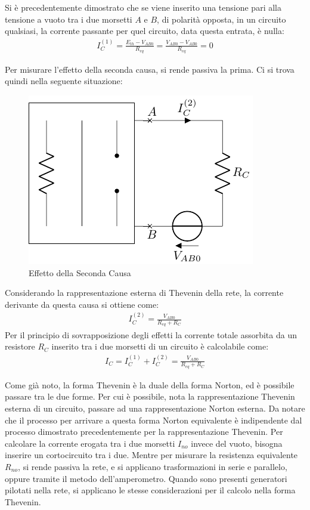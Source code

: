 \documentclass{article}
\numberwithin{equation}{subsection}
\begin{document}
Si è precedentemente dimostrato che se viene inserito una tensione pari alla tensione a vuoto tra i due morsetti $A$ e $B$, di polarità opposta, in un circuito qualsiasi, 
la corrente passante per quel circuito, data questa entrata, è nulla: 
\begin{gather*}
    I_C^{(1)}=\displaystyle\frac{E_{th}-V_{AB0}}{R_{eq}}=\frac{V_{AB0}-V_{AB0}}{R_{eq}}=0
\end{gather*}

Per misurare l'effetto della seconda causa, si rende passiva la prima. Ci si trova quindi nella seguente situazione: 
\begin{figure}[H]%
    \centering
    \includegraphics{seconda-causa-corrente-carico.pdf}
    \caption{Effetto della Seconda Causa}
    \label{fig:seconda-causa-corrente-carico}
\end{figure}
Considerando la rappresentazione esterna di Thevenin della rete, la corrente derivante da questa causa si ottiene come:
\begin{gather*}
    I_C^{(2)}=\displaystyle\frac{V_{AB0}}{R_{eq}+R_{C}}
\end{gather*}
Per il principio di sovrapposizione degli effetti la corrente totale assorbita da un resistore $R_C$ inserito tra i due morsetti di un circuito è calcolabile come:
\begin{gather*}
    I_C=I_C^{(1)}+I_C^{(2)}=\displaystyle\frac{V_{AB0}}{R_{eq}+R_{C}}
\end{gather*}


Come già noto, la forma Thevenin è la duale della forma Norton, ed è possibile passare tra le due forme. Per cui è possibile, nota la rappresentazione Thevenin esterna di 
un circuito, passare ad una rappresentazione Norton esterna. Da notare che il processo per arrivare a questa forma Norton equivalente è indipendente dal 
processo dimostrato precedentemente per la rappresentazione Thevenin. Per calcolare la corrente erogata tra i due morsetti $I_{no}$ invece del vuoto, bisogna inserire un 
cortocircuito tra i due. Mentre per misurare la resistenza equivalente $R_{no}$, si rende passiva la rete, e si applicano trasformazioni in serie e parallelo, oppure tramite 
il metodo dell'amperometro. Quando sono presenti generatori pilotati nella rete, si applicano le stesse considerazioni per il calcolo nella forma Thevenin. 
\end{document}
